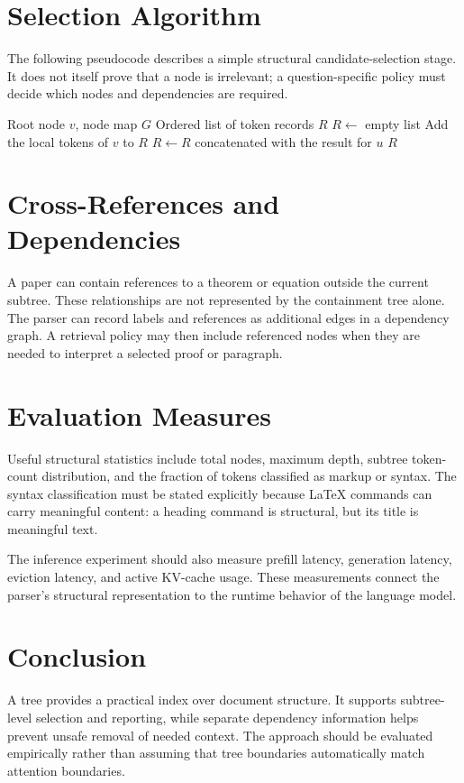 \documentclass{article}
\begin{document}
\section{Selection Algorithm}
The following pseudocode describes a simple structural candidate-selection stage. It does not itself prove that a node is irrelevant; a question-specific policy must decide which nodes and dependencies are required.

\begin{algorithm}
\caption{Collect tokens for a selected subtree}
\begin{algorithmic}[1]
\Require Root node $v$, node map $G$
\Ensure Ordered list of token records $R$
\State $R\gets$ empty list
\State Add the local tokens of $v$ to $R$
  \State $R\gets R$ concatenated with the result for $u$
\EndFor
\State \Return $R$
\end{algorithmic}
\end{algorithm}

\section{Cross-References and Dependencies}
A paper can contain references to a theorem or equation outside the current subtree. These relationships are not represented by the containment tree alone. The parser can record labels and references as additional edges in a dependency graph. A retrieval policy may then include referenced nodes when they are needed to interpret a selected proof or paragraph.

\section{Evaluation Measures}
Useful structural statistics include total nodes, maximum depth, subtree token-count distribution, and the fraction of tokens classified as markup or syntax. The syntax classification must be stated explicitly because LaTeX commands can carry meaningful content: a heading command is structural, but its title is meaningful text.

The inference experiment should also measure prefill latency, generation latency, eviction latency, and active KV-cache usage. These measurements connect the parser's structural representation to the runtime behavior of the language model.

\section{Conclusion}
A tree provides a practical index over document structure. It supports subtree-level selection and reporting, while separate dependency information helps prevent unsafe removal of needed context. The approach should be evaluated empirically rather than assuming that tree boundaries automatically match attention boundaries.
\end{document}
